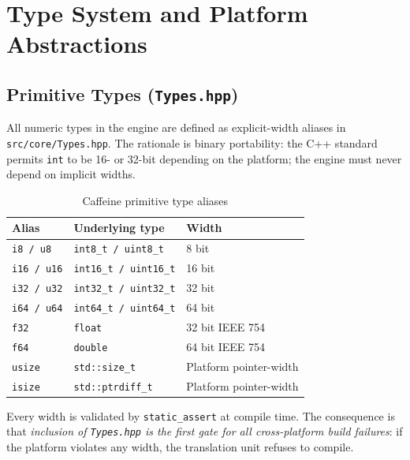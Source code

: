 \documentclass[12pt, a4paper]{report}
\theoremstyle{definition}
\theoremstyle{remark}
\begin{document}
\chapter{Type System and Platform Abstractions}

\section{Primitive Types (\texttt{Types.hpp})}

All numeric types in the engine are defined as explicit-width aliases in
\texttt{src/core/Types.hpp}. The rationale is binary portability: the C++
standard permits \texttt{int} to be 16- or 32-bit depending on the platform;
the engine must never depend on implicit widths.

\begin{table}[H]
\centering
\caption{Caffeine primitive type aliases}
\begin{tabular}{lll}
\toprule
\textbf{Alias} & \textbf{Underlying type} & \textbf{Width} \\
\midrule
\texttt{i8 / u8}   & \texttt{int8\_t / uint8\_t}   & 8 bit  \\
\texttt{i16 / u16} & \texttt{int16\_t / uint16\_t} & 16 bit \\
\texttt{i32 / u32} & \texttt{int32\_t / uint32\_t} & 32 bit \\
\texttt{i64 / u64} & \texttt{int64\_t / uint64\_t} & 64 bit \\
\texttt{f32}       & \texttt{float}                & 32 bit IEEE 754 \\
\texttt{f64}       & \texttt{double}               & 64 bit IEEE 754 \\
\texttt{usize}     & \texttt{std::size\_t}         & Platform pointer-width \\
\texttt{isize}     & \texttt{std::ptrdiff\_t}      & Platform pointer-width \\
\bottomrule
\end{tabular}
\end{table}

Every width is validated by \texttt{static\_assert} at compile time.
The consequence is that \emph{inclusion of \texttt{Types.hpp} is the first
gate for all cross-platform build failures}: if the platform violates any
width, the translation unit refuses to compile.
\end{document}
